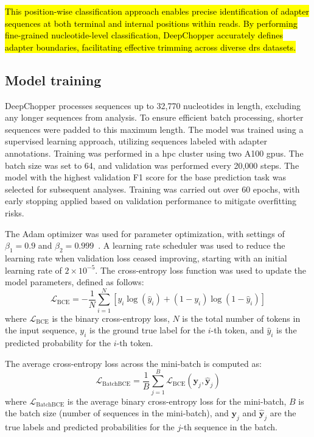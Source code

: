 \documentclass[pdflatex,sn-nature, lineno]{sn-jnl}%
\begin{document}
\hl{This position-wise classification approach enables precise identification of adapter sequences at both terminal and internal positions within reads. By performing fine-grained nucleotide-level classification, DeepChopper accurately defines adapter boundaries, facilitating effective trimming across diverse \mbox{\gls{drs}} datasets.}

\subsection{Model training}\label{ssec:training}


DeepChopper processes sequences up to 32,770 nucleotides in length, excluding any longer sequences from analysis.
To ensure efficient batch processing, shorter sequences were padded to this maximum length.
The model was trained using a supervised learning approach, utilizing sequences labeled with adapter annotations.
Training was performed in a \gls{hpc} cluster using two A100 \glspl{gpu}.
The batch size was set to 64, and validation was performed every 20,000 steps.
The model with the highest validation F1 score for the base prediction task was selected for subsequent analyses.
Training was carried out over \num{60} epochs, with early stopping applied based on validation performance to mitigate overfitting risks.

The Adam optimizer was used for parameter optimization, with settings of \(\beta_{1} = 0.9 \) and \(\beta_{2} = 0.999 \)~\cite{kingma2014adam}.
A learning rate scheduler was used to reduce the learning rate when validation loss ceased improving, starting with an initial learning rate of \(2 \times 10^{-5} \).
The cross-entropy loss function was used to update the model parameters, defined as follows:
\[
    \mathcal{L}_{\textrm{BCE}} = -\frac{1}{N} \sum_{i=1}^{N} [y_i \log(\hat{y}_i) + (1 - y_i) \log(1 - \hat{y}_i)]
\]
where \(\mathcal{L}_{\textrm{BCE}}\) is the binary cross-entropy loss, \(N\) is the total number of tokens in the input sequence, \(y_i\) is the ground true label for the \(i\)-th token, and \(\hat{y}_i\) is the predicted probability for the \(i\)-th token.

The average cross-entropy loss across the mini-batch is computed as:
\[
    \mathcal{L}_{\textrm{BatchBCE}} = \frac{1}{B} \sum_{j=1}^{B} \mathcal{L}_{\textrm{BCE}}(\mathbf{y}_j, \hat{\mathbf{y}}_j)
\]
where \(\mathcal{L}_{\textrm{BatchBCE}}\) is the average binary cross-entropy loss for the mini-batch, \(B\) is the batch size (number of sequences in the mini-batch),  and \(\mathbf{y}_j\) and \(\hat{\mathbf{y}}_j\) are the true labels and predicted probabilities for the \(j\)-th sequence in the batch.
\end{document}
